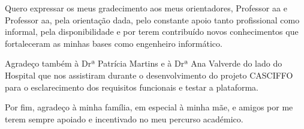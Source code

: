 \acknowledgements

 Quero expressar os meus gradecimento aos meus orientadores, Professor aa e Professor aa, pela orientação dada, pelo constante apoio tanto profissional como informal, pela disponibilidade e por terem contribuído novos conhecimentos que fortaleceram as minhas bases como engenheiro informático.

Agradeço também à Drª Patrícia Martins e à Drª Ana Valverde do lado do Hospital que nos assistiram durante o desenvolvimento do projeto CASCIFFO para o esclarecimento dos requisitos funcionais e testar a plataforma. 
 
Por fim, agradeço à minha família, em especial à minha mãe, e amigos por me terem sempre apoiado e incentivado no meu percurso académico.

